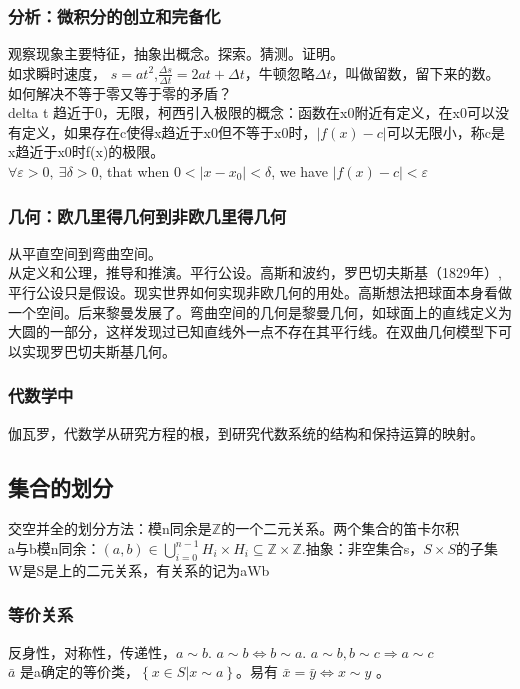 \subsubsection{分析：微积分的创立和完备化}
观察现象主要特征，抽象出概念。探索。猜测。证明。\\
如求瞬时速度， $s=at^2$,$\frac{\Delta s}{\Delta t}=2at+\Delta t$，牛顿忽略$\Delta t$，叫做留数，留下来的数。\\
如何解决不等于零又等于零的矛盾？\\
delta t 趋近于0，无限，柯西引入极限的概念：函数在x0附近有定义，在x0可以没有定义，如果存在c使得x趋近于x0但不等于x0时，$|f(x)-c|$可以无限小，称c是x趋近于x0时f(x)的极限。\\
$\forall \varepsilon >0,\ \exists \delta >0$, that when $0<|x-x_0|<\delta$, we have $|f(x)-c|<\varepsilon$
\subsubsection{几何：欧几里得几何到非欧几里得几何}
从平直空间到弯曲空间。\\
从定义和公理，推导和推演。平行公设。高斯和波约，罗巴切夫斯基（1829年）,平行公设只是假设。现实世界如何实现非欧几何的用处。高斯想法把球面本身看做一个空间。后来黎曼发展了。弯曲空间的几何是黎曼几何，如球面上的直线定义为大圆的一部分，这样发现过已知直线外一点不存在其平行线。在双曲几何模型下可以实现罗巴切夫斯基几何。\\
\subsubsection{代数学中}
伽瓦罗，代数学从研究方程的根，到研究代数系统的结构和保持运算的映射。

\subsection{集合的划分}
交空并全的划分方法：模n同余是$\mathbb Z$的一个二元关系。两个集合的笛卡尔积\\
a与b模n同余：$(a,b) \in \bigcup _{i=0}^{n-1} H_i \times H_i \subseteq \mathbb Z \times \mathbb Z$.抽象：非空集合s，$S\times S$的子集W是S是上的二元关系，有关系的记为aWb\\

\subsubsection{等价关系}
反身性，对称性，传递性，$a \sim b$. $a \sim b \Leftrightarrow b \sim a$. $a \sim b , b \sim c \Rightarrow a \sim c$\\
$\bar a$ 是a确定的等价类，$\left\{ x \in S |x \sim a \right\}$。易有
$\bar x = \bar y \Leftrightarrow x \sim y$ 。\\


